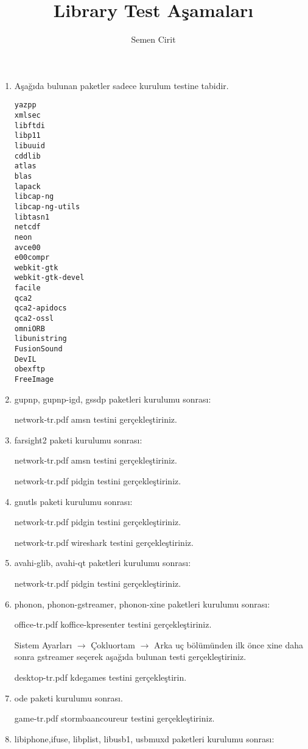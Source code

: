 \documentclass[a4paper,10pt]{article}
\title{Library Test Aşamaları}
\author{Semen Cirit}
\begin{document}
\maketitle
\begin{enumerate}
\item Aşağıda bulunan paketler sadece kurulum testine tabidir.
\begin{verbatim}
yazpp
xmlsec
libftdi
libp11
libuuid
cddlib
atlas
blas
lapack
libcap-ng
libcap-ng-utils
libtasn1
netcdf
neon
avce00
e00compr
webkit-gtk
webkit-gtk-devel
facile
qca2
qca2-apidocs
qca2-ossl
omniORB
libunistring
FusionSound
DevIL
obexftp
FreeImage
\end{verbatim}
\item gupnp, gupnp-igd, gssdp paketleri kurulumu sonrası:

network-tr.pdf amsn testini gerçekleştiriniz.

\item farsight2 paketi kurulumu sonrası:

network-tr.pdf amsn testini gerçekleştiriniz.

network-tr.pdf pidgin testini gerçekleştiriniz.

\item gnutls paketi kurulumu sonrası:

network-tr.pdf pidgin testini gerçekleştiriniz.

network-tr.pdf wireshark testini gerçekleştiriniz.

\item avahi-glib, avahi-qt paketleri kurulumu sonrası:

network-tr.pdf pidgin testini gerçekleştiriniz.

\item phonon, phonon-gstreamer, phonon-xine paketleri kurulumu sonrası:

office-tr.pdf koffice-kpresenter testini gerçekleştiriniz.

Sistem Ayarları $\rightarrow$ Çokluortam $\rightarrow$ Arka uç bölümünden ilk önce xine daha sonra gstreamer seçerek aşağıda bulunan testi gerçekleştiriniz.

desktop-tr.pdf kdegames testini gerçekleştirin.
\item ode paketi kurulumu sonrası.

game-tr.pdf stormbaancoureur testini gerçekleştiriniz.

\item libiphone,ifuse, libplist, libusb1, usbmuxd paketleri kurulumu sonrası:


\end{enumerate}
\end{document}
